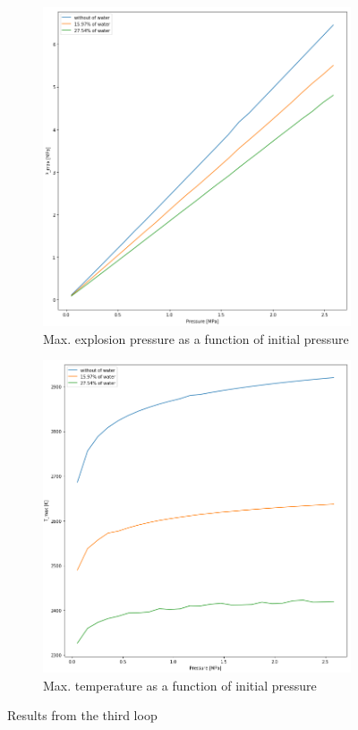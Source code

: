 \documentclass[a4paper]{article}
\begin{document}
\begin{figure}[H]
    \centering
    \begin{subfigure}[h]{0.4\textwidth}
        \includegraphics[width=\textwidth]{3_Pmax_to_P_2.png}
        	\caption{Max. explosion pressure as a function of initial pressure}
        \label{fig:3_1}
    \end{subfigure}
    \qquad
    \begin{subfigure}[h]{0.4\textwidth}
        \includegraphics[width=\textwidth]{3_T_to_P_b.png}
        	\caption{Max. temperature as a function of initial pressure}
        \label{fig:3_2}
    \end{subfigure}
    \caption{Results from the third loop}\label{fig:3}
\end{figure}
\end{document}
